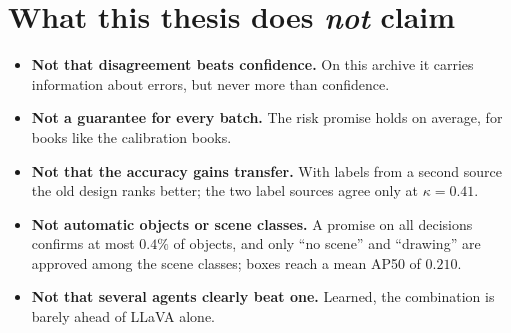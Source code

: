 \documentclass[10pt,a4paper]{article}
\begin{document}
\section{What this thesis does \emph{not} claim}
\begin{itemize}
  \item \textbf{Not that disagreement beats confidence.} On this archive it carries information about errors, but never more than confidence.
  \item \textbf{Not a guarantee for every batch.} The risk promise holds on average, for books like the calibration books.
  \item \textbf{Not that the accuracy gains transfer.} With labels from a second source the old design ranks better; the two label sources agree only at $\kappa=0.41$.
  \item \textbf{Not automatic objects or scene classes.} A promise on all decisions confirms at most $0.4\%$ of objects, and only ``no scene'' and ``drawing'' are approved among the scene classes; boxes reach a mean AP50 of $0.210$.
  \item \textbf{Not that several agents clearly beat one.} Learned, the combination is barely ahead of LLaVA alone.
\end{itemize}
\end{document}
